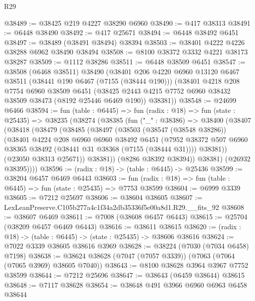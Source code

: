 \begin{lexlean}{R29}
\begin{coremodule}
@38489 := @38425 @219 @4227 @38290 @6960
@38490 := @417 @38313
@38491 := @6448 @38490
@38492 := @417 @25671
@38494 := @6448 @38492 @6451
@38497 := @38489 (@38491 @38494) @38394
@38503 := @38401 @4222 @4226 @38288 @6962 @38490 @38494
@38508 := @8100 @38372 @3332 @4221 @38173 @38287
@38509 := @1112 @38286
@38511 := @6448 @38509 @6451
@38547 := @38508
    (@6468 @38511)
    @38490
    (@38401
      @206
      @4220
      @6960
      @13120
      @6467
      @38511
      (@38441 @190 @6467 (@7155 (@38444 @190)))
      (@38401
        @4218
        @208
        @7754
        @6960
        @38509
        @6451
        (@38425 @2443 @4215 @7752 @6960 @38432 @38509 @38473 (@8192 @25446 @6469 @190))
        @38381))
@38548 := @24699 @6466
@38594 := fun (table : @6445) =>
  fun (radix : @18) =>
  fun (state : @25435) =>
  @38235
    (@38274
      (@38385
        (fun ("_" : @38386) =>
        @38400
          (@38407
            (@38418
              (@38479
                (@38485
                  (@38497
                    (@38503
                      (@38547 (@38548 @38286))
                      (@38401
                        @4224
                        @208
                        @6960
                        @6960
                        @38492
                        @6451
                        (@7952
                          @38372
                          @507
                          @6960
                          @38365
                          @38492
                          (@38441 @31 @38368 (@7155 (@38444 @31))))
                        @38381))
                    (@23050 @38313 @25671))
                  @38381))
              (@8286 @38392 @38394))
            @38381)
          (@26932 @38395))))
@38596 := (radix : @18) -> (table : @6445) -> @25436
@38599 := @38204 @6457 @6469 @6443
@38603 := fun (radix : @18) => fun (table : @6445) => fun (state : @25435) => @7753 @38599
@38604 := @6999 @3339
@38605 := @7212 @25697
@38606 := @38604 @38605
@38607 := LexLeanPreserve.C105b277a4c1f34a2db35336f5e00a8d1.R29.__fits_92
@38608 := @38607 @6469
@38611 := @7008 (@38608 @6457 @6443)
@38615 := @25704 (@38209 @6457 @6469 @6443)
@38616 := @38611 @38615
@38620 := (radix : @18) -> (table : @6445) -> (state : @25435) -> @38606 @38616
@38624 := @7022 @3339 @38605 @38616 @3969
@38628 := @38224 (@7030 (@7034 @6458) @7198)
@38638 := @38624 @38628 (@7047 (@7057 @3339)) (@7063 (@7064 (@7065 @3969) @38605 @7040))
@38643 := @8100 @38628 @3964 @3967 @7752 @38599
@38644 := @7212 @25696
@38647 := @38643 (@6459 @38644) @38615
@38648 := @7117 @38628
@38654 := @38648 @491 @3966 @6960 @6963 @6458 @38644

\end{coremodule}
\end{lexlean}
